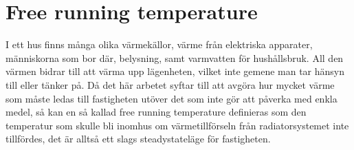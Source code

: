 \section{Free running temperature}\label{sec:freerunningtemp}
I ett hus finns många olika värmekällor, värme från elektriska apparater, människorna som bor där, belysning, samt varmvatten för hushållsbruk. All den värmen bidrar till att värma upp lägenheten, vilket inte gemene man tar hänsyn till eller tänker på. Då det här arbetet syftar till att avgöra hur mycket värme som måste ledas till fastigheten utöver det som inte gör att påverka med enkla medel, så kan en så kallad free running temperature definieras som den temperatur som skulle bli inomhus om värmetillförseln från radiatorsystemet inte tillfördes, det är alltså ett slags steadystateläge för fastigheten.
